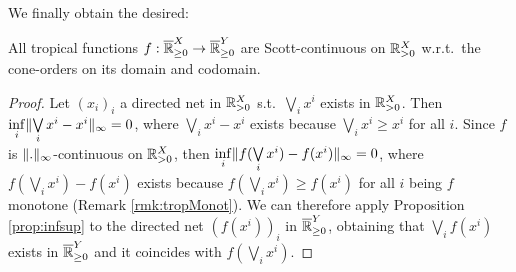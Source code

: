 
We finally obtain the desired:

\begin{theorem}
 All tropical functions $f:\overline{\mathbb{R}}^X_{\geq 0}\to\overline{\mathbb{R}}^Y_{\geq 0}$ are Scott-continuous on $\mathbb{R}^X_{> 0}$ w.r.t.\ the cone-orders on its domain and codomain.
\end{theorem}
\begin{proof}
 Let $(x_i)_i$ a directed net in $\mathbb{R}^X_{> 0}$ s.t.\ $\bigvee\limits_i x^i$ exists in $\mathbb{R}^X_{> 0}$.
 Then $\inf\limits_i \lVert\bigvee\limits_i x^i - x^i\rVert_\infty =0$, where $\bigvee\limits_i x^i - x^i$ exists because $\bigvee\limits_i x^i \geq x^i$ for all $i$.
 Since $f$ is $\lVert.\rVert_\infty$-continuous on $\mathbb{R}^X_{> 0}$, then $\inf\limits_i \lVert f(\bigvee\limits_i x^i) - f(x^i)\rVert_\infty =0$, where $f(\bigvee\limits_i x^i) - f(x^i)$ exists because $f(\bigvee\limits_i x^i) \geq f(x^i)$ for all $i$ being $f$ monotone (Remark \ref{rmk:tropMonot}).
 We can therefore apply Proposition \ref{prop:infsup} to the directed net $(f(x^i))_i$ in $\overline{\mathbb{R}}^Y_{\geq 0}$, obtaining that $\bigvee\limits_i f(x^i)$ exists in $\overline{\mathbb{R}}^Y_{\geq 0}$ and it coincides with $f(\bigvee\limits_i x^i)$.
\end{proof}



